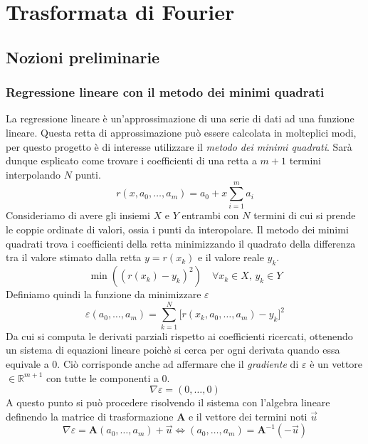 \chapter{Trasformata di Fourier}

\section{Nozioni preliminarie}

\subsection{Regressione lineare con il metodo dei minimi quadrati}
La regressione lineare \`e un'approssimazione di una serie di dati ad una
funzione lineare. Questa retta di approssimazione pu\`o essere calcolata in
molteplici modi, per questo progetto \`e di interesse utilizzare il
\emph{metodo dei minimi quadrati}.  Sar\`a dunque esplicato come trovare i
coefficienti di una retta a \(m+1\) termini interpolando \(N\) punti.
\begin{equation}
    r(x, a_0, \dots, a_m) = a_0 + x\sum_{i=1}^{m}a_i
\end{equation}
Consideriamo di avere gli insiemi \(X\) e \(Y\) entrambi con \(N\) termini di
cui si prende le coppie ordinate di valori, ossia i punti da interopolare.  Il
metodo dei minimi quadrati trova i coefficienti della retta minimizzando il
quadrato della differenza tra il valore stimato dalla retta \(y = r(x_k)\) e il
valore reale \(y_k\).
\begin{equation*}
    \min((r(x_k) - y_k)^2)\quad \forall x_k\in X,\, y_k\in Y
\end{equation*}
Definiamo quindi la funzione da minimizzare \(\varepsilon\)
\begin{equation}
    \varepsilon(a_0, \dots, a_m) = \sum_{k=1}^{N}\Big[r(x_k, a_0, \dots, a_m)  - y_k\Big]^2
\end{equation}
Da cui si computa le derivati parziali rispetto ai coefficienti ricercati,
ottenendo un sistema di equazioni lineare poich\`e si cerca per ogni derivata
quando essa equivale a 0. Ci\`o corrisponde anche ad affermare che il
\emph{gradiente} di \(\varepsilon\) \`e un vettore
\(\in\mathbb{R}^{m+1}\) con tutte le componenti a 0.
\begin{equation*}
    \nabla\varepsilon = (0, \dots, 0 )
\end{equation*}
A questo punto si pu\`o procedere risolvendo il sistema con l'algebra lineare
definendo la matrice di trasformazione \(\mathbf{A}\) e il vettore dei termini
noti \(\vec{u}\)
\begin{equation*}
    \nabla \varepsilon = \mathbf{A}
        ( a_0, \dots, a_m ) + \vec{u} \iff
        ( a_0, \dots, a_m ) =
        \mathbf{A}^{-1}(-\vec{u})
\end{equation*}

